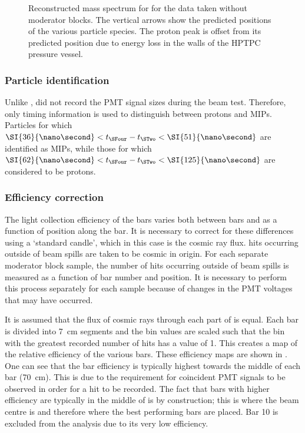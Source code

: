 \begin{figure}[h]
  \begin{adjustbox}{max totalsize=.9\textwidth, center}
    
  \end{adjustbox}
  \caption[Reconstructed mass spectrum for \SFour]{Reconstructed mass spectrum for \SFour for the data taken without moderator blocks. The vertical arrows show the predicted positions of the various particle species. The proton peak is offset from its predicted position due to energy loss in the walls of the HPTPC pressure vessel.}
  \label{fig:s4MassDistribution}
\end{figure}

\subsubsection{Particle identification}
\label{sec:hptpc_beam_flux:methods:s4:pid}

Unlike \SThree, \SFour did not record the PMT signal sizes during the beam test.
Therefore, only timing information is used to distinguish between protons and MIPs.
Particles for which $\SI{36}{\nano\second} < t_{\SFour} - t_{\STwo} < \SI{51}{\nano\second}$ are identified as MIPs, while those for which $\SI{62}{\nano\second} < t_{\SFour} - t_{\STwo} < \SI{125}{\nano\second}$ are considered to be protons.

\subsubsection{Efficiency correction}
\label{sec:hptpc_beam_flux:methods:s4:efficiency}

The light collection efficiency of the \SFour bars varies both between bars and as a function of position along the bar.
It is necessary to correct for these differences using a `standard candle', which in this case is the cosmic ray flux.
\SFour hits occurring outside of beam spills are taken to be cosmic in origin.
For each separate moderator block sample, the number of hits occurring outside of beam spills is measured as a function of bar number and position.
It is necessary to perform this process separately for each sample because of changes in the PMT voltages that may have occurred.

It is assumed that the flux of cosmic rays through each part of \SFour is equal.
Each \SFour bar is divided into \SI{7}{\centi\metre} segments and the bin values are scaled such that the bin with the greatest recorded number of hits has a value of 1.
This creates a map of the relative efficiency of the various \SFour bars.
These efficiency maps are shown in .
One can see that the bar efficiency is typically highest towards the middle of each bar (\SI{70}{\centi\metre}).
This is due to the requirement for coincident PMT signals to be observed in order for a hit to be recorded.
The fact that bars with higher efficiency are typically in the middle of \SFour is by construction; this is where the beam centre is and therefore where the best performing bars are placed.
Bar 10 is excluded from the analysis due to its very low efficiency.

